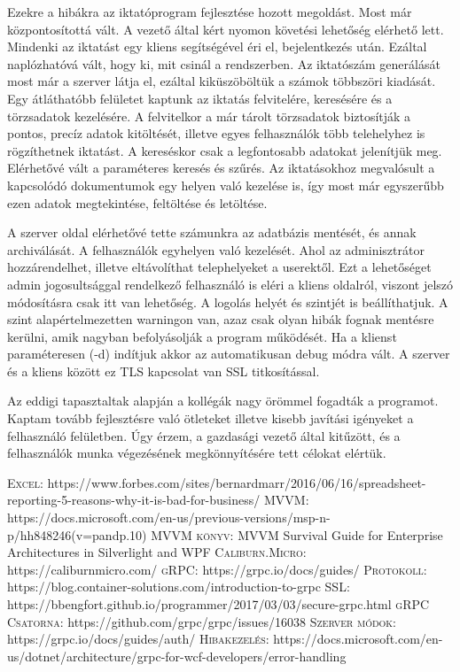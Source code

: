 \documentclass[
]{thesis-ekf}
\theoremstyle{definition}
\theoremstyle{remark}
\begin{document}
Ezekre a hibákra az iktatóprogram fejlesztése hozott megoldást. Most már központosítottá vált. A vezető által kért nyomon követési lehetőség elérhető lett. Mindenki az iktatást egy kliens segítségével éri el, bejelentkezés után. Ezáltal naplózhatóvá vált, hogy ki, mit csinál a rendszerben. Az iktatószám generálását most már a szerver látja el, ezáltal kiküszöböltük a számok többszöri kiadását. Egy átláthatóbb felületet kaptunk az iktatás felvitelére, keresésére és a törzsadatok kezelésére.  A felvitelkor a már tárolt törzsadatok biztosítják a pontos, precíz adatok kitöltését, illetve egyes felhasználók több telehelyhez is rögzíthetnek iktatást.  A kereséskor csak a legfontosabb adatokat jelenítjük meg. Elérhetővé vált a paraméteres keresés és szűrés.  Az iktatásokhoz megvalósult a kapcsolódó dokumentumok egy helyen való kezelése is, így most már egyszerűbb ezen adatok megtekintése, feltöltése és letöltése. 

A szerver oldal elérhetővé tette számunkra az adatbázis mentését, és annak archiválását. A felhasználók egyhelyen való kezelését. Ahol az adminisztrátor hozzárendelhet, illetve eltávolíthat telephelyeket a userektől. Ezt a lehetőséget admin jogosultsággal rendelkező felhasználó is eléri a kliens oldalról, viszont jelszó módosításra csak itt van lehetőség.  A logolás helyét és szintjét is beállíthatjuk. A szint alapértelmezetten warningon van, azaz csak olyan hibák fognak mentésre kerülni, amik nagyban befolyásolják a program működését. Ha a klienst paraméteresen (-d) indítjuk akkor az automatikusan debug módra vált. A szerver és a kliens között ez TLS kapcsolat van SSL titkosítással. 

Az eddigi tapasztaltak alapján a kollégák nagy örömmel fogadták a programot. Kaptam tovább fejlesztésre való ötleteket illetve kisebb javítási igényeket a felhasználó felületben.  Úgy érzem, a gazdasági vezető által kitűzött, és a felhasználók munka végezésének megkönnyítésére tett célokat elértük.
\begin{thebibliography}{2}
\textsc{Excel: }https://www.forbes.com/sites/bernardmarr/2016/06/16/spreadsheet-reporting-5-reasons-why-it-is-bad-for-business/	
 \textsc{MVVM:} https://docs.microsoft.com/en-us/previous-versions/msp-n-p/hh848246(v=pandp.10)
\textsc{MVVM könyv: } MVVM Survival Guide for Enterprise Architectures in Silverlight and WPF
\textsc{Caliburn.Micro: }https://caliburnmicro.com/
\textsc{gRPC: }https://grpc.io/docs/guides/
\textsc{Protokoll: } https://blog.container-solutions.com/introduction-to-grpc
\textsc{SSL:} https://bbengfort.github.io/programmer/2017/03/03/secure-grpc.html
\textsc{gRPC Csatorna: } https://github.com/grpc/grpc/issues/16038
\textsc{Szerver módok:} https://grpc.io/docs/guides/auth/
\textsc{Hibakezelés:} https://docs.microsoft.com/en-us/dotnet/architecture/grpc-for-wcf-developers/error-handling


\end{thebibliography}
\end{document}
